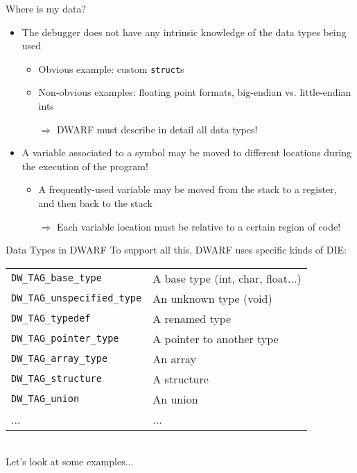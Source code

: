 \begin{frame}{Where is my data?}
\begin{itemize}
\item The debugger does not have any intrinsic knowledge of the data types being used
\medskip
	\begin{itemize}
	\normalsize
	\item Obvious example: custom \texttt{struct}s
	\item Non-obvious examples: floating point formats, big-endian vs. little-endian ints
	\medskip
	\item[$\Rightarrow$] DWARF must describe in detail all data types!
	\end{itemize}
\medskip
\item A variable associated to a symbol may be moved to \alert{different locations} during the execution of the program!
\medskip
	\begin{itemize}
	\normalsize
	\item A frequently-used variable may be moved from the stack to a register, and then back to the stack
	\medskip
	\item[$\Rightarrow$] Each variable location must be relative to a certain region of code!
	\end{itemize}
\end{itemize}
\end{frame}


\begin{frame}{Data Types in DWARF}
To support all this, DWARF uses specific kinds of DIE:\\
\medskip
\begin{tabular}{ll}
\texttt{DW\_TAG\_base\_type} & A base type (int, char, float...) \\
\texttt{DW\_TAG\_unspecified\_type} & An unknown type (void) \\
\texttt{DW\_TAG\_typedef} & A renamed type \\
\texttt{DW\_TAG\_pointer\_type} & A pointer to another type \\
\texttt{DW\_TAG\_array\_type} & An array \\
\texttt{DW\_TAG\_structure} & A structure \\
\texttt{DW\_TAG\_union} & An union \\
... & ...\\
\end{tabular}\\
\bigskip
Let's look at some examples...\\
\end{frame}


